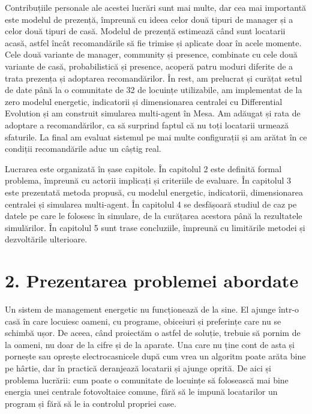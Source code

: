 \documentclass[12pt,a4paper]{report}
\begin{document}
Contribuțiile personale ale acestei lucrări sunt mai multe, dar cea mai importantă este modelul de prezență, împreună cu ideea celor două tipuri de manager și a celor două tipuri de casă. Modelul de prezență estimează când sunt locatarii acasă, astfel încât recomandările să fie trimise și aplicate doar în acele momente. Cele două variante de manager, community și presence, combinate cu cele două variante de casă, probabilistică și presence, acoperă patru moduri diferite de a trata prezența și adoptarea recomandărilor. În rest, am prelucrat și curățat setul de date până la o comunitate de 32 de locuințe utilizabile, am implementat de la zero modelul energetic, indicatorii și dimensionarea centralei cu Differential Evolution și am construit simularea multi-agent în Mesa. Am adăugat și rata de adoptare a recomandărilor, ca să surprind faptul că nu toți locatarii urmează sfaturile. La final am evaluat sistemul pe mai multe configurații și am arătat în ce condiții recomandările aduc un câștig real.

Lucrarea este organizată în șase capitole. În capitolul 2 este definită formal problema, împreună cu actorii implicați și criteriile de evaluare. În capitolul 3 este prezentată metoda propusă, cu modelul energetic, indicatorii, dimensionarea centralei și simularea multi-agent. În capitolul 4 se desfășoară studiul de caz pe datele pe care le folosesc în simulare, de la curățarea acestora până la rezultatele simulărilor. În capitolul 5 sunt trase concluziile, împreună cu limitările metodei și dezvoltările ulterioare.

\clearpage

\chapter*{2. Prezentarea problemei abordate}

Un sistem de management energetic nu funcționează de la sine. El ajunge într-o casă în care locuiesc oameni, cu programe, obiceiuri și preferințe care nu se schimbă ușor. De aceea, când proiectăm o astfel de soluție, trebuie să pornim de la oameni, nu doar de la cifre și de la aparate. Una care nu ține cont de asta și pornește sau oprește electrocasnicele după cum vrea un algoritm poate arăta bine pe hârtie, dar în practică deranjează locatarii și ajunge oprită. De aici și problema lucrării: cum poate o comunitate de locuințe să folosească mai bine energia unei centrale fotovoltaice comune, fără să le impună locatarilor un program și fără să le ia controlul propriei case.
\end{document}
